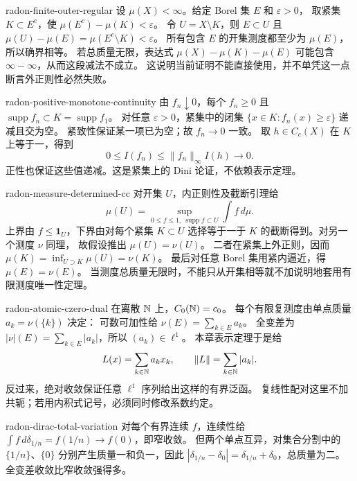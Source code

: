 \begin{solution}{radon-finite-outer-regular}
设 \(\mu(X)<\infty\)。给定 Borel 集 \(E\) 和 \(\varepsilon>0\)，
取紧集 \(K\subset E^c\)，使
\(\mu(E^c)-\mu(K)<\varepsilon\)。
令 \(U=X\setminus K\)，则 \(E\subset U\) 且
\(\mu(U)-\mu(E)=\mu(E^c\setminus K)<\varepsilon\)。
所有包含 \(E\) 的开集测度都至少为 \(\mu(E)\)，所以确界相等。
若总质量无限，表达式 \(\mu(X)-\mu(K)-\mu(E)\) 可能包含
\(\infty-\infty\)，从而这段减法不成立。
这说明当前证明不能直接使用，并不单凭这一点断言外正则性必然失败。
\end{solution}

\begin{solution}{radon-positive-monotone-continuity}
由 \(f_n\downarrow0\)，每个 \(f_n\ge0\) 且
\(\operatorname{supp}f_n\subset K=\operatorname{supp}f_1\)。
对任意 \(\varepsilon>0\)，紧集中的闭集
\(\{x\in K:f_n(x)\ge\varepsilon\}\) 递减且交为空。
紧致性保证某一项已为空；故 \(f_n\to0\) 一致。
取 \(h\in C_c(X)\) 在 \(K\) 上等于一，得到
\[
 0\le I(f_n)\le\|f_n\|_\infty I(h)\longrightarrow0.
\]
正性也保证这些值递减。这是紧集上的 Dini 论证，不依赖表示定理。
\end{solution}

\begin{solution}{radon-measure-determined-cc}
对开集 \(U\)，内正则性及截断引理给
\[
 \mu(U)=\sup_{0\le f\le1,\ \operatorname{supp}f\subset U}\int f\,d\mu.
\]
上界由 \(f\le\mathbf1_U\)，下界由对每个紧集 \(K\subset U\)
选择等于一于 \(K\) 的截断得到。对另一个测度 \(\nu\) 同理，
故假设推出 \(\mu(U)=\nu(U)\)。
二者在紧集上外正则，因而
\(\mu(K)=\inf_{U\supset K}\mu(U)=\nu(K)\)。
最后对任意 Borel 集用紧内逼近，得 \(\mu(E)=\nu(E)\)。
当测度总质量无限时，不能只从开集相等就不加说明地套用有限测度唯一性定理。
\end{solution}

\begin{solution}{radon-atomic-czero-dual}
在离散 \(\mathbb{N}\) 上，\(C_0(\mathbb{N})=c_0\)。
每个有限复测度由单点质量 \(a_k=\nu(\{k\})\) 决定：
可数可加性给 \(\nu(E)=\sum_{k\in E}a_k\)。
全变差为 \(|\nu|(E)=\sum_{k\in E}|a_k|\)，所以
\((a_k)\in\ell^1\)。
本章表示定理于是给
\[
 L(x)=\sum_{k\in\mathbb{N}}a_kx_k,\qquad \|L\|=\sum_{k\in\mathbb{N}}|a_k|.
\]
反过来，绝对收敛保证任意 \(\ell^1\) 序列给出这样的有界泛函。
复线性配对这里不加共轭；若用内积式记号，必须同时修改系数约定。
\end{solution}

\begin{solution}{radon-dirac-total-variation}
对每个有界连续 \(f\)，连续性给
\(\int f\,d\delta_{1/n}=f(1/n)\to f(0)\)，即窄收敛。
但两个单点互异，对集合分割中的 \(\{1/n\}\)、\(\{0\}\)
分别产生质量一和负一，因此
\(|\delta_{1/n}-\delta_0|=\delta_{1/n}+\delta_0\)，总质量为二。
全变差收敛比窄收敛强得多。
\end{solution}


